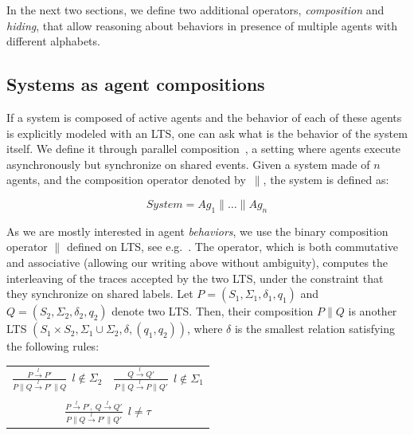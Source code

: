 In the next two sections, we define two additional operators, \emph{composition} and \emph{hiding}, that allow reasoning about behaviors in presence of multiple agents with different alphabets.

\subsection{Systems as agent compositions}

If a system is composed of active agents and the behavior of each of these agents is explicitly modeled with an LTS, one can ask what is the behavior of the system itself. We define it through parallel composition~\cite{Hoare:1985}, a setting where agents execute asynchronously but synchronize on shared events. Given a system made of $n$ agents, and the composition operator denoted by~$\parallel$, the system is defined as:

\begin{equation}
System = Ag_1 \parallel \ldots \parallel Ag_n
\end{equation}

As we are mostly interested in agent \emph{behaviors}, we use the binary composition operator $\parallel$ defined on LTS, see e.g.~\cite{Giannakopoulou:1999, Magee:1999}. The operator, which is both commutative and associative (allowing our writing above without ambiguity), computes the interleaving of the traces accepted by the two LTS, under the constraint that they synchronize on shared labels. Let $P = (S_1,\Sigma_1,\delta_1,q_{1})$ and $Q = (S_2,\Sigma_2,\delta_2,q_{2})$ denote two LTS. Then, their composition $P \parallel Q$ is another LTS $(S_1 \times S_2,\Sigma_1\cup\Sigma_2,\delta,(q_1,q_2))$, where $\delta$ is the smallest relation satisfying the following rules:

\begin{center}
\begin{tabular}{cc}
$\frac{\displaystyle P \stackrel{l}{\longrightarrow} P'}{\displaystyle P \parallel Q \stackrel{l}{\longrightarrow} P' \parallel Q}~~l \notin \Sigma_2$ &
$\frac{\displaystyle Q \stackrel{l}{\longrightarrow} Q'}{\displaystyle P \parallel Q \stackrel{l}{\longrightarrow} P \parallel Q'}~~l \notin \Sigma_1$ \\
 & \\
\multicolumn{2}{c}{$\frac{\displaystyle P \stackrel{l}{\longrightarrow} P',~Q \stackrel{l}{\longrightarrow} Q'}{\displaystyle P \parallel Q \stackrel{l}{\longrightarrow} P' \parallel Q'}~~l \neq \tau$} \\
\end{tabular}
\end{center}

